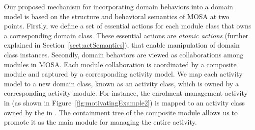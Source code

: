 Our proposed mechanism for incorporating domain behaviors into a domain model is based on the structure and behavioral semantics of MOSA at two points. 
%
Firstly, we define a set of essential actions for each module class that owns a corresponding domain class. These essential actions are \textit{atomic actions} (further explained in Section~\ref{sect:actSemantics}), that enable manipulation of domain class instances. 
%
Secondly, domain behaviors are viewed as collaborations among modules in MOSA. Each module collaboration is coordinated by a composite module and captured by a corresponding activity model. We map each activity model to a new domain class, known as an activity class, which is owned by a corresponding activity module. For instance, the enrolment management activity in \courseman (as shown in Figure~\ref{fig:motivatingExample2}) is mapped to an activity class owned by the  in \courseman. The containment tree of the composite module allows us to promote it as the main module for managing the entire activity.

